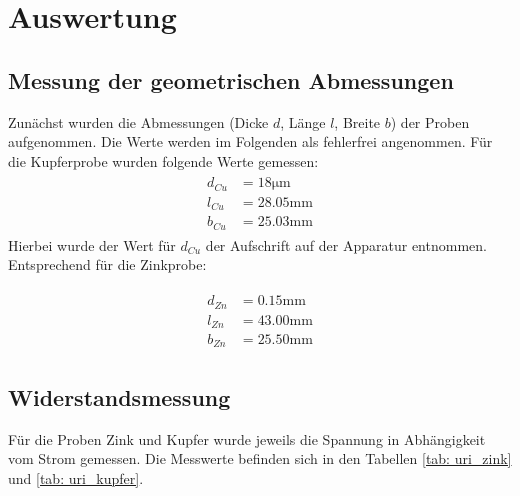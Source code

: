 \section{Auswertung}

\subsection{Messung der geometrischen Abmessungen}
Zunächst wurden die Abmessungen (Dicke $d$, Länge $l$, Breite $b$) der Proben aufgenommen. Die Werte
werden im Folgenden als fehlerfrei angenommen. Für die Kupferprobe wurden folgende Werte gemessen:
\begin{align}
  \begin{aligned}
    d_{Cu} &= 18 \si{\micro \meter} \\
    l_{Cu} &= 28.05 \si{\milli \meter}\\
    b_{Cu} &= 25.03 \si{\milli \meter}
        \label{eq: abmessungen_kupfer}
      \end{aligned}
\end{align}
Hierbei wurde der Wert für $d_{Cu}$ der Aufschrift auf der Apparatur entnommen.
Entsprechend für die Zinkprobe:

\begin{align}
  \begin{aligned}
    d_{Zn} &= 0.15 \si{\milli \meter} \\
    l_{Zn} &= 43.00 \si{\milli \meter}\\
    b_{Zn} &= 25.50 \si{\milli \meter}
        \label{eq: abmessungen_zink}
      \end{aligned}
\end{align}



\subsection{Widerstandsmessung}
Für die Proben Zink und Kupfer wurde jeweils die Spannung in Abhängigkeit vom Strom gemessen. Die Messwerte befinden sich
in den Tabellen \ref{tab: uri_zink} und \ref{tab: uri_kupfer}.

\begin{minipage}{\textwidth}

\hfill

\end{minipage}

